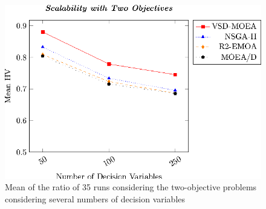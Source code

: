 %
%
%


\begin{figure}[t]
\centering
\includegraphics[scale=0.85]{Images/Graphic-Scalability-2obj_tikz-figure0.eps}
%
\caption{Mean of the \HV{} ratio of 35 runs considering the two-objective problems considering several numbers of decision variables}\label{fig:variable-decision-scalability-2obj}
\end{figure}

